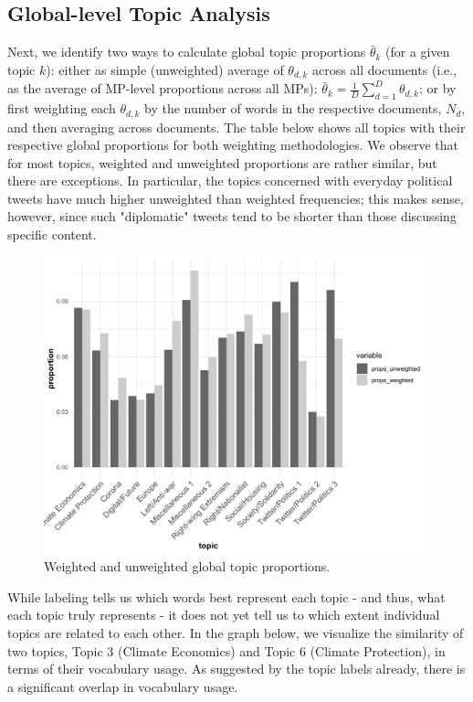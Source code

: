 \subsection{Global-level Topic Analysis}
\label{Global-level Topic Analysis}

Next, we identify two ways to calculate global topic proportions $\bar{\theta}_k$ (for a given topic $k$): either as simple (unweighted) average of $\theta_{d,k}$ across all documents (i.e., as the average of MP-level proportions across all MPs): $\bar{\theta}_k = \frac{1}{D}\sum_{d=1}^{D}\theta_{d,k}$; or by first weighting each $\theta_{d,k}$ by the number of words in the respective documents, $N_d$, and then averaging across documents. The table below shows all topics with their respective global proportions for both weighting methodologies. We observe that for most topics, weighted and unweighted proportions are rather similar, but there are exceptions. In particular, the topics concerned with everyday political tweets have much higher unweighted than weighted frequencies; this makes sense, however, since such "diplomatic" tweets tend to be shorter than those discussing specific content.

\begin{figure}[h!]
  \centering
  \captionsetup{justification=centering,margin=2cm}
  \includegraphics[scale = 0.5]{../plots/4_3/global_thetas.pdf}
  \caption{Weighted and unweighted global topic proportions.}
  \label{fig:global_thetas}
\end{figure}

While labeling tells us which words best represent each topic - and thus, what each topic truly represents - it does not yet tell us to which extent individual topics are related to each other. In the graph below, we visualize the similarity of two topics, Topic 3 (Climate Economics) and Topic 6 (Climate Protection), in terms of their vocabulary usage. As suggested by the topic labels already, there is a significant overlap in vocabulary usage.

